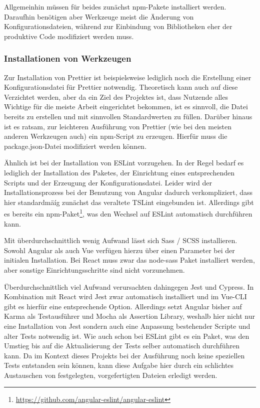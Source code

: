 Allgemeinhin müssen für beides zunächst \gls{npm}-Pakete installiert werden. Daraufhin benötigen aber Werkzeuge meist die Änderung von Konfigurationsdateien, während zur Einbindung von Bibliotheken eher der produktive Code modifiziert werden muss.

\subsubsection{Installationen von Werkzeugen}
Zur Installation von Prettier ist beispielsweise lediglich noch die Erstellung einer Konfigurationsdatei für Prettier notwendig. Theoretisch kann auch auf diese Verzichtet werden, aber da ein Ziel des Projektes ist, dass Nutzende alles Wichtige für die meiste Arbeit eingerichtet bekommen, ist es sinnvoll, die Datei bereits zu erstellen und mit sinnvollen Standardwerten zu füllen. Darüber hinaus ist es ratsam, zur leichteren Ausführung von Prettier (wie bei den meisten anderen Werkzeugen auch) ein \gls{npm}-Script zu erzeugen. Hierfür muss die package.json-Datei modifiziert werden können.

Ähnlich ist bei der Installation von ESLint vorzugehen. In der Regel bedarf es lediglich der Installation des Paketes, der Einrichtung eines entsprechenden Scripts und der Erzeugung der Konfigurationsdatei. Leider wird der Installationsprozess bei der Benutzung von Angular dadurch verkompliziert, dass hier standardmäíg zunächst das veraltete TSLint eingebunden ist. Allerdings gibt es bereits ein \gls{npm}-Paket\footnote{\url{https://github.com/angular-eslint/angular-eslint}}, was den Wechsel auf ESLint automatisch durchführen kann.

Mit überdurchschnittlich wenig Aufwand lässt sich Sass / SCSS installieren. Sowohl Angular als auch Vue verfügen hierzu über einen Parameter bei der initialen Installation. Bei React muss zwar das node-sass Paket installiert werden, aber sonstige Einrichtungsschritte sind nicht vorzunehmen.

Überdurchschnittlich viel Aufwand verursachten dahingegen Jest und Cypress. In Kombination mit React wird Jest zwar automatisch installiert und im Vue-\gls{CLI} gibt es hierfür eine entsprechende Option. Allerdings setzt Angular bisher auf Karma als Testausführer und Mocha als Assertion Library, weshalb hier nicht nur eine Installation von Jest sondern auch eine Anpassung bestehender Scripte und alter Tests notwendig ist. Wie auch schon bei ESLint gibt es ein Paket, was den Umstieg bis auf die Aktualisierung der Tests selber automatisch durchführen kann. Da im Kontext dieses Projekts bei der Ausführung noch keine speziellen Tests entstanden sein können, kann diese Aufgabe hier durch ein schlichtes Austauschen von festgelegten, vorgefertigten Dateien erledigt werden.

